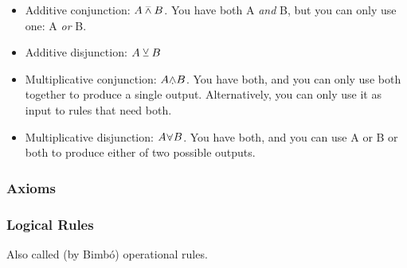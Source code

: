\documentclass{article}
\begin{document}
\begin{itemize}
\item Additive conjunction: \(A \barwedge B\). You have both A
  \textit{and} B, but you can only use one: A \textit{or} B.
\item Additive disjunction: \(A \veebar B\)
\item Multiplicative conjunction: \(A\fusion B\). You have both, and
  you can only use both together to produce a single output. Alternatively, you can only use it as input to rules that need both.
\item Multiplicative disjunction: \(A\fission B\). You have both, and
  you can use A or B or both to produce either of two possible outputs.
\end{itemize}



\subsubsection{Axioms}


\subsubsection{Logical Rules}

Also called (by Bimbó) operational rules.


\end{document}
